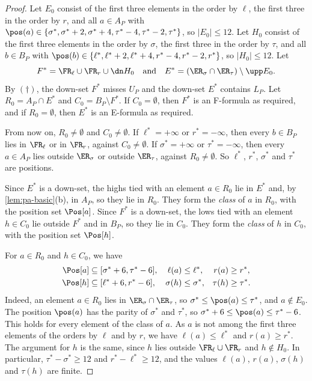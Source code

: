 \begin{proof}
Let $E_0$ consist of the first three elements in the order by $\ell$, the first three in the order by $r$, and all $a \in A_P$ with $\pos(a) \in \{\sigma^*, \sigma^* + 2, \sigma^* + 4, \tau^* - 4, \tau^* - 2, \tau^*\}$, so $|E_0| \leq 12$.
Let $H_0$ consist of the first three elements in the order by $\sigma$, the first three in the order by $\tau$, and all $b \in B_P$ with $\pos(b) \in \{\ell^*, \ell^* + 2, \ell^* + 4, r^* - 4, r^* - 2, r^*\}$, so $|H_0| \leq 12$.
Let
\[
F^* = \FR_\ell \cup \FR_r \cup \dn H_0 \quad\text{and}\quad E^* = (\ER_\sigma \cap \ER_\tau) \setminus \upp E_0.
\]
By $(\dagger)$, the down-set $F^*$ misses $U_P$ and the down-set $E^*$ contains $L_P$.
Let $R_0 = A_P \cap E^*$ and $C_0 = B_P \setminus F^*$.
If $C_0 = \emptyset$, then $F^*$ is an F-formula as required, and if $R_0 = \emptyset$, then $E^*$ is an E-formula as required.

From now on, $R_0 \neq \emptyset$ and $C_0 \neq \emptyset$.
If $\ell^* = +\infty$ or $r^* = -\infty$, then every $b \in B_P$ lies in $\FR_\ell$ or in $\FR_r$, against $C_0 \neq \emptyset$.
If $\sigma^* = +\infty$ or $\tau^* = -\infty$, then every $a \in A_P$ lies outside $\ER_\sigma$ or outside $\ER_\tau$, against $R_0 \neq \emptyset$.
So $\ell^*$, $r^*$, $\sigma^*$ and $\tau^*$ are positions.

Since $E^*$ is a down-set, the highs tied with an element $a \in R_0$ lie in $E^*$ and, by \cref{lem:pa-basic}(b), in $A_P$, so they lie in $R_0$.
They form the \emph{class} of $a$ in $R_0$, with the position set $\Pos[a]$.
Since $F^*$ is a down-set, the lows tied with an element $h \in C_0$ lie outside $F^*$ and in $B_P$, so they lie in $C_0$.
They form the \emph{class} of $h$ in $C_0$, with the position set $\Pos[h]$.

For $a \in R_0$ and $h \in C_0$, we have
\begin{align}
\label{eq:pa-ranges-r}
\Pos[a] &\subseteq [\sigma^* + 6, \tau^* - 6], & \ell(a) &\leq \ell^*, & r(a) &\geq r^*,\\
\label{eq:pa-ranges-c}
\Pos[h] &\subseteq [\ell^* + 6, r^* - 6], & \sigma(h) &\leq \sigma^*, & \tau(h) &\geq \tau^*.
\end{align}
Indeed, an element $a \in R_0$ lies in $\ER_\sigma \cap \ER_\tau$, so $\sigma^* \leq \pos(a) \leq \tau^*$, and $a \notin E_0$.
The position $\pos(a)$ has the parity of $\sigma^*$ and $\tau^*$, so $\sigma^* + 6 \leq \pos(a) \leq \tau^* - 6$.
This holds for every element of the class of $a$.
As $a$ is not among the first three elements of the orders by $\ell$ and by $r$, we have $\ell(a) \leq \ell^*$ and $r(a) \geq r^*$.
The argument for $h$ is the same, since $h$ lies outside $\FR_\ell \cup \FR_r$ and $h \notin H_0$.
In particular, $\tau^* - \sigma^* \geq 12$ and $r^* - \ell^* \geq 12$, and the values $\ell(a)$, $r(a)$, $\sigma(h)$ and $\tau(h)$ are finite.


\end{proof}
